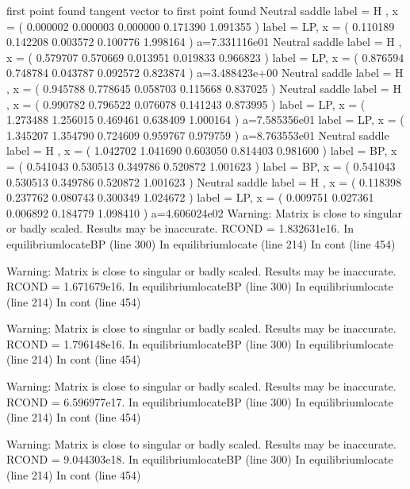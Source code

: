 \documentclass[letterpaper,10pt,english]{jupyterBook}
\begin{document}
\begin{sphinxVerbatim}[commandchars=\\\{\}]
first point found
tangent vector to first point found
Neutral saddle
label = H , x = ( 0.000002 \PYGZhy{}0.000003 \PYGZhy{}0.000000 0.171390 1.091355 )
label = LP, x = ( \PYGZhy{}0.110189 0.142208 0.003572 0.100776 1.998164 )
a=\PYGZhy{}7.331116e\PYGZhy{}01
Neutral saddle
label = H , x = ( \PYGZhy{}0.579707 0.570669 0.013951 \PYGZhy{}0.019833 0.966823 )
label = LP, x = ( \PYGZhy{}0.876594 0.748784 0.043787 \PYGZhy{}0.092572 0.823874 )
a=3.488423e+00
Neutral saddle
label = H , x = ( \PYGZhy{}0.945788 0.778645 0.058703 \PYGZhy{}0.115668 0.837025 )
Neutral saddle
label = H , x = ( \PYGZhy{}0.990782 0.796522 0.076078 \PYGZhy{}0.141243 0.873995 )
label = LP, x = ( \PYGZhy{}1.273488 1.256015 0.469461 \PYGZhy{}0.638409 1.000164 )
a=7.585356e\PYGZhy{}01
label = LP, x = ( \PYGZhy{}1.345207 1.354790 0.724609 \PYGZhy{}0.959767 0.979759 )
a=\PYGZhy{}8.763553e\PYGZhy{}01
Neutral saddle
label = H , x = ( \PYGZhy{}1.042702 1.041690 0.603050 \PYGZhy{}0.814403 0.981600 )
label = BP, x = ( \PYGZhy{}0.541043 0.530513 0.349786 \PYGZhy{}0.520872 1.001623 )
label = BP, x = ( \PYGZhy{}0.541043 0.530513 0.349786 \PYGZhy{}0.520872 1.001623 )
Neutral saddle
label = H , x = ( \PYGZhy{}0.118398 0.237762 0.080743 \PYGZhy{}0.300349 1.024672 )
label = LP, x = ( \PYGZhy{}0.009751 0.027361 0.006892 \PYGZhy{}0.184779 1.098410 )
a=4.606024e\PYGZhy{}02
Warning: Matrix is close to singular or badly scaled. Results may be inaccurate. RCOND =  1.832631e\PYGZhy{}16.
\PYGZgt{} In equilibrium\PYGZgt{}locateBP (line 300)
In equilibrium\PYGZgt{}locate (line 214)
In cont (line 454)

Warning: Matrix is close to singular or badly scaled. Results may be inaccurate. RCOND =  1.671679e\PYGZhy{}16.
\PYGZgt{} In equilibrium\PYGZgt{}locateBP (line 300)
In equilibrium\PYGZgt{}locate (line 214)
In cont (line 454)

Warning: Matrix is close to singular or badly scaled. Results may be inaccurate. RCOND =  1.796148e\PYGZhy{}16.
\PYGZgt{} In equilibrium\PYGZgt{}locateBP (line 300)
In equilibrium\PYGZgt{}locate (line 214)
In cont (line 454)

Warning: Matrix is close to singular or badly scaled. Results may be inaccurate. RCOND =  6.596977e\PYGZhy{}17.
\PYGZgt{} In equilibrium\PYGZgt{}locateBP (line 300)
In equilibrium\PYGZgt{}locate (line 214)
In cont (line 454)

Warning: Matrix is close to singular or badly scaled. Results may be inaccurate. RCOND =  9.044303e\PYGZhy{}18.
\PYGZgt{} In equilibrium\PYGZgt{}locateBP (line 300)
In equilibrium\PYGZgt{}locate (line 214)
In cont (line 454)


\end{sphinxVerbatim}
\end{document}
